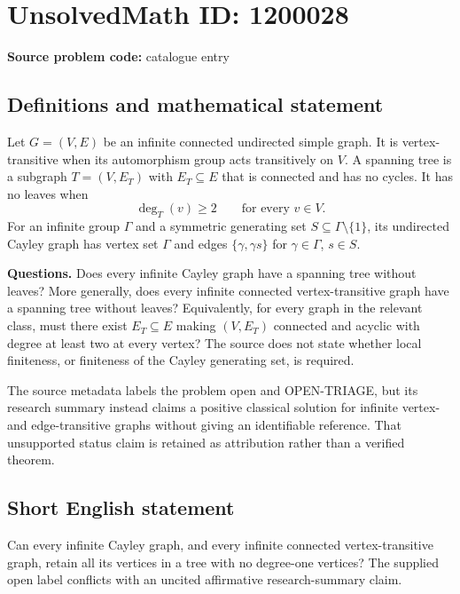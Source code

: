 \documentclass[11pt]{article}
\begin{document}
\section*{UnsolvedMath ID: 1200028}
\textbf{Source problem code:} catalogue entry
\subsection{Definitions and mathematical statement}
Let $G=(V,E)$ be an infinite connected undirected simple graph. It is vertex-transitive when its automorphism group acts transitively on $V$. A spanning tree is a subgraph $T=(V,E_T)$ with $E_T\subseteq E$ that is connected and has no cycles. It has no leaves when
\[
\deg_T(v)\geq2\qquad\text{for every }v\in V.
\]
For an infinite group $\Gamma$ and a symmetric generating set $S\subseteq\Gamma\setminus\{1\}$, its undirected Cayley graph has vertex set $\Gamma$ and edges $\{\gamma,\gamma s\}$ for $\gamma\in\Gamma$, $s\in S$.

\textbf{Questions.} Does every infinite Cayley graph have a spanning tree without leaves? More generally, does every infinite connected vertex-transitive graph have a spanning tree without leaves? Equivalently, for every graph in the relevant class, must there exist $E_T\subseteq E$ making $(V,E_T)$ connected and acyclic with degree at least two at every vertex? The source does not state whether local finiteness, or finiteness of the Cayley generating set, is required.

The source metadata labels the problem open and OPEN-TRIAGE, but its research summary instead claims a positive classical solution for infinite vertex- and edge-transitive graphs without giving an identifiable reference. That unsupported status claim is retained as attribution rather than a verified theorem.
\subsection{Short English statement}
Can every infinite Cayley graph, and every infinite connected vertex-transitive graph, retain all its vertices in a tree with no degree-one vertices? The supplied open label conflicts with an uncited affirmative research-summary claim.
\end{document}
